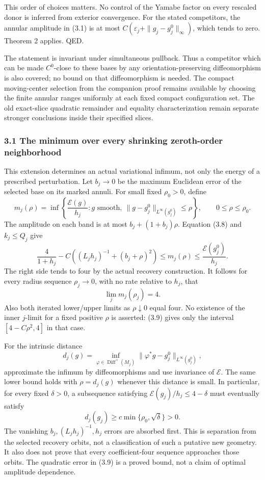 \documentclass[
  10pt,
]{article}
\begin{document}
This order of choices matters. No control of the Yamabe factor on every
rescaled donor is inferred from exterior convergence. For the stated
competitors, the annular amplitude in (3.1) is at most
\(C(\varepsilon_j+\|g_j-g_j^0\|_\infty)\), which tends to zero. Theorem
2 applies. QED.

The statement is invariant under simultaneous pullback. Thus a
competitor which can be made \(C^0\)-close to these bases by any
orientation-preserving diffeomorphism is also covered; no bound on that
diffeomorphism is needed. The compact moving-center selection from the
companion proof remains available by choosing the finite annular ranges
uniformly at each fixed compact configuration set. The old exact-slice
quadratic remainder and equality characterization remain separate
stronger conclusions inside their specified slices.

\hypertarget{the-minimum-over-every-shrinking-zeroth-order-neighborhood}{%
\subsubsection{3.1 The minimum over every shrinking zeroth-order
neighborhood}\label{the-minimum-over-every-shrinking-zeroth-order-neighborhood}}

This extension determines an actual variational infimum, not only the
energy of a prescribed perturbation. Let \(b_j\to0\) be the maximum
Euclidean error of the selected base on its marked annuli. For small
fixed \(\rho_0>0\), define \[
 m_j(\rho)=\inf\left\{\frac{\mathcal E(g)}{h_j}:
       g\text{ smooth},\
       \|g-g_j^0\|_{L^\infty(g_j^0)}\le\rho\right\},
 \qquad 0\le\rho\le\rho_0 .
\] The amplitude on each band is at most \(b_j+(1+b_j)\rho\). Equation
(3.8) and \(k_j\le Q_j\) give \[
 \frac4{1+h_j}
   -C\left((L_jh_j)^{-1}+(b_j+\rho)^2\right)
 \le m_j(\rho)\le\frac{\mathcal E(g_j^0)}{h_j}.        \tag{3.9}
\] The right side tends to four by the actual recovery construction. It
follows for every radius sequence \(\rho_j\to0\), with no rate relative
to \(h_j\), that \[
                         \lim_j m_j(\rho_j)=4.        \tag{3.10}
\] Also both iterated lower/upper limits as \(\rho\downarrow0\) equal
four. No existence of the inner \(j\)-limit for a fixed positive
\(\rho\) is asserted: (3.9) gives only the interval \([4-C\rho^2,4]\) in
that case.

For the intrinsic distance \[
 d_j(g)=\inf_{\varphi\in\operatorname{Diff}^+(M_j)}
       \|\varphi^*g-g_j^0\|_{L^\infty(g_j^0)},
\] approximate the infimum by diffeomorphisms and use invariance of
\(\mathcal E\). The same lower bound holds with \(\rho=d_j(g)\) whenever
this distance is small. In particular, for every fixed \(\delta>0\), a
subsequence satisfying \(\mathcal E(g_j)/h_j\le4-\delta\) must
eventually satisfy \[
                    d_j(g_j)\ge c\min\{\rho_0,\sqrt\delta\}>0.
                                                               \tag{3.11}
\] The vanishing \(b_j,(L_jh_j)^{-1},h_j\) errors are absorbed first.
This is separation from the selected recovery orbits, not a
classification of such a putative new geometry. It also does not prove
that every coefficient-four sequence approaches those orbits. The
quadratic error in (3.9) is a proved bound, not a claim of optimal
amplitude dependence.
\end{document}
